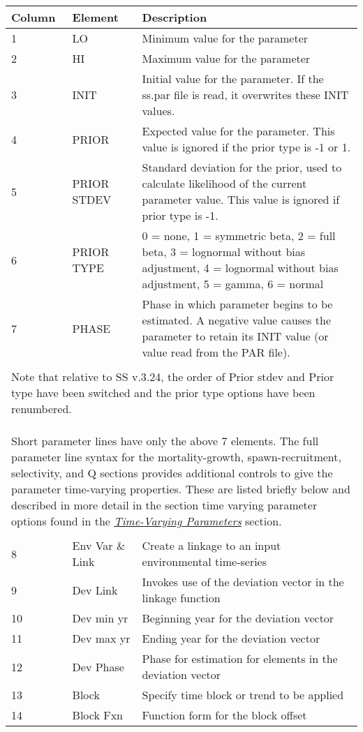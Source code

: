 \hypertarget{Prior}{} \hypertarget{paraOrder}{}
\begin{center}
	\begin{tabular}{p{2cm} p{3cm} p{10cm}}
		Column & Element & Description\\
		\hline
		1 & LO & Minimum value for the parameter\\
		2 & HI & Maximum value for the parameter\\
		3 & INIT & Initial value for the parameter.  If the ss.par file is read, it overwrites these INIT values.\\
		4 & PRIOR & Expected value for the parameter.  This value is ignored if the prior type is -1 or 1.\\
		5 & PRIOR STDEV & Standard deviation for the prior, used to calculate likelihood of the current parameter value. This value is ignored if prior type is -1. \\
		6 & PRIOR TYPE  & 0 = none, 1 = symmetric beta, 2 = full beta, 3 = lognormal without bias adjustment, 4 = lognormal without bias adjustment, 5 = gamma, 6 = normal \\
		7 & PHASE & Phase in which parameter begins to be estimated.  A negative value causes the parameter to retain its INIT value (or value read from the PAR file).\\
		 & & \\
		\multicolumn{3}{l}{\parbox{16cm}{Note that relative to SS v.3.24,  the order of Prior stdev and Prior type have been switched and the prior type options have been renumbered.
		\\\\
		Short parameter lines have only the above 7 elements.  The full parameter line syntax for the mortality-growth, spawn-recruitment, selectivity, and Q sections provides additional controls to give the parameter time-varying properties.  These are listed briefly below and described in more detail in the section time varying parameter options found in the \hyperlink{TVpara}{\textit{Time-Varying Parameters}} section.
		}}\\
		 & & \\
		8  & Env Var \& Link & Create a linkage to an input environmental time-series\\
		9  & Dev Link & Invokes use of the deviation vector in the linkage function \\
		10 & Dev min yr & Beginning year for the deviation vector \\
		11 & Dev max yr & Ending year for the deviation vector\\
		12 & Dev Phase & Phase for estimation for elements in the deviation vector \\
		13 & Block & Specify time block or trend to be applied \\
		14 & Block Fxn & Function form for the block offset\\
		\hline
	\end{tabular}
\end{center}

